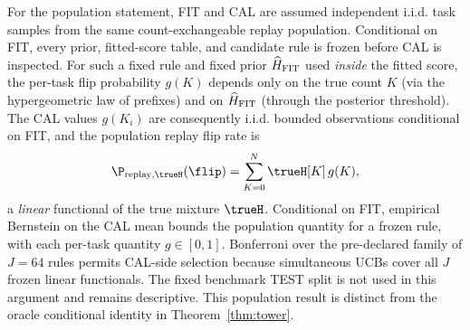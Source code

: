 For the population statement, FIT and CAL are assumed independent i.i.d.
task samples from the same count-exchangeable replay population. Conditional
on FIT, every prior, fitted-score table, and candidate rule is frozen before
CAL is inspected. For such a fixed rule and fixed prior $\widehat H_{\rm FIT}$
used \emph{inside} the fitted score, the per-task flip probability $g(K)$
depends only on the true count $K$ (via the hypergeometric law of prefixes)
and on $\widehat H_{\rm FIT}$ (through the posterior threshold). The CAL
values $g(K_i)$ are consequently i.i.d. bounded observations conditional on
FIT, and the population replay flip rate is
\[
\P_{\text{replay},\trueH}(\flip)=\sum_{K=0}^{N} \trueH[K]\,g(K),
\]
a \emph{linear} functional of the true mixture $\trueH$. Conditional on FIT,
empirical Bernstein on the CAL mean bounds the population quantity for a
frozen rule, with each per-task quantity $g\in[0,1]$. Bonferroni over the
pre-declared family of $J=64$ rules permits CAL-side selection because
simultaneous UCBs cover all $J$ frozen linear functionals. The fixed benchmark
TEST split is not used in this argument and remains descriptive. This
population result is distinct from the oracle conditional identity in
Theorem~\ref{thm:tower}.

